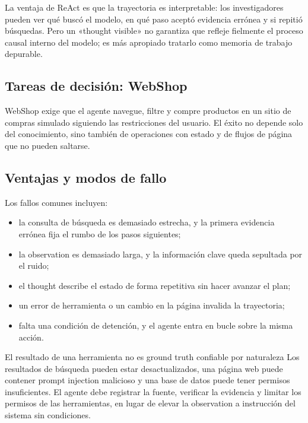 La ventaja de ReAct es que la trayectoria es interpretable: los investigadores pueden ver qué buscó el modelo, en qué paso aceptó evidencia errónea y si repitió búsquedas. Pero un «thought visible» no garantiza que refleje fielmente el proceso causal interno del modelo; es más apropiado tratarlo como memoria de trabajo depurable.

\subsection{Tareas de decisión: WebShop}

WebShop exige que el agente navegue, filtre y compre productos en un sitio de compras simulado siguiendo las restricciones del usuario. El éxito no depende solo del conocimiento, sino también de operaciones con estado y de flujos de página que no pueden saltarse.


\subsection{Ventajas y modos de fallo}


Los fallos comunes incluyen:

\begin{itemize}
    \item la consulta de búsqueda es demasiado estrecha, y la primera evidencia errónea fija el rumbo de los pasos siguientes;
    \item la observation es demasiado larga, y la información clave queda sepultada por el ruido;
    \item el thought describe el estado de forma repetitiva sin hacer avanzar el plan;
    \item un error de herramienta o un cambio en la página invalida la trayectoria;
    \item falta una condición de detención, y el agente entra en bucle sobre la misma acción.
\end{itemize}

\begin{warningbox}{El resultado de una herramienta no es ground truth confiable por naturaleza}
Los resultados de búsqueda pueden estar desactualizados, una página web puede contener prompt injection malicioso y una base de datos puede tener permisos insuficientes. El agente debe registrar la fuente, verificar la evidencia y limitar los permisos de las herramientas, en lugar de elevar la observation a instrucción del sistema sin condiciones.
\end{warningbox}

